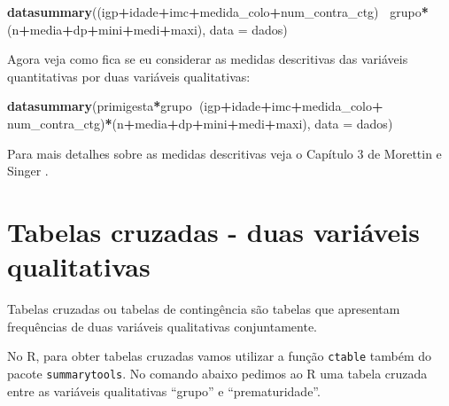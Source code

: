 \documentclass[
]{book}
\newenvironment{Shaded}{\begin{snugshade}}{\end{snugshade}}
\newcommand{\DataTypeTok}[1]{\textcolor[rgb]{0.13,0.29,0.53}{#1}}
\newcommand{\KeywordTok}[1]{\textcolor[rgb]{0.13,0.29,0.53}{\textbf{#1}}}
\newcommand{\NormalTok}[1]{#1}
\newcommand{\OperatorTok}[1]{\textcolor[rgb]{0.81,0.36,0.00}{\textbf{#1}}}
\newcommand{\StringTok}[1]{\textcolor[rgb]{0.31,0.60,0.02}{#1}}
\begin{document}
\begin{Shaded}
\begin{Highlighting}[]
\KeywordTok{datasummary}\NormalTok{((igp}\OperatorTok{+}\NormalTok{idade}\OperatorTok{+}\NormalTok{imc}\OperatorTok{+}\NormalTok{medida_colo}\OperatorTok{+}\NormalTok{num_contra_ctg)}\OperatorTok{~}
\StringTok{              }\NormalTok{grupo}\OperatorTok{*}\NormalTok{(n}\OperatorTok{+}\NormalTok{media}\OperatorTok{+}\NormalTok{dp}\OperatorTok{+}\NormalTok{mini}\OperatorTok{+}\NormalTok{medi}\OperatorTok{+}\NormalTok{maxi), }\DataTypeTok{data =}\NormalTok{ dados)}
\end{Highlighting}
\end{Shaded}

Agora veja como fica se eu considerar as medidas descritivas das variáveis quantitativas por duas variáveis qualitativas:

\begin{Shaded}
\begin{Highlighting}[]
\KeywordTok{datasummary}\NormalTok{(primigesta}\OperatorTok{*}\NormalTok{grupo}\OperatorTok{~}\NormalTok{(igp}\OperatorTok{+}\NormalTok{idade}\OperatorTok{+}\NormalTok{imc}\OperatorTok{+}\NormalTok{medida_colo}\OperatorTok{+}
\StringTok{  }\NormalTok{num_contra_ctg)}\OperatorTok{*}\NormalTok{(n}\OperatorTok{+}\NormalTok{media}\OperatorTok{+}\NormalTok{dp}\OperatorTok{+}\NormalTok{mini}\OperatorTok{+}\NormalTok{medi}\OperatorTok{+}\NormalTok{maxi), }\DataTypeTok{data =}\NormalTok{ dados)}
\end{Highlighting}
\end{Shaded}

Para mais detalhes sobre as medidas descritivas veja o Capítulo 3 de Morettin e Singer \citep{morettin2020introduccaoa}.

\hypertarget{tabelas}{%
\section{Tabelas cruzadas - duas variáveis qualitativas}\label{tabelas}}

Tabelas cruzadas ou tabelas de contingência são tabelas que apresentam frequências de duas variáveis qualitativas conjuntamente.

No R, para obter tabelas cruzadas vamos utilizar a função \texttt{ctable} também do pacote \texttt{summarytools}. No comando abaixo pedimos ao R uma tabela cruzada entre as variáveis qualitativas ``grupo'' e ``prematuridade''.

\begin{Shaded}
\end{Shaded}
\end{document}

